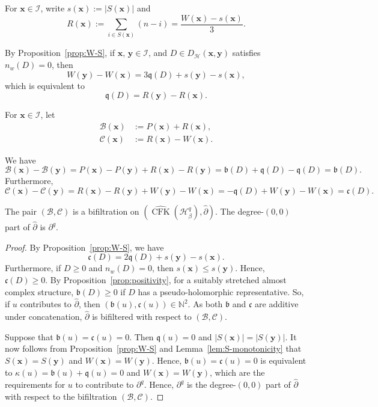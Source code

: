 \documentclass[11pt]{amsart}
\numberwithin{equation}{section}
\numberwithin{figure}{section}
\theoremstyle{definition}
\newcommand{\cB}{\mathcal{B}}
\newcommand{\cC}{\mathcal{C}}
\newcommand{\cH}{\mathcal{H}}
\newcommand{\cI}{\mathcal{I}}
\newcommand{\bN}{\mathbb{N}}
\newcommand{\ph}{\widehat{\partial}}
\newcommand{\fb}{\mathfrak{b}}
\newcommand{\fc}{\mathfrak{c}}
\newcommand{\fq}{\mathfrak{q}}
\DeclareMathOperator{\CFK}{CFK}
\newcommand{\CFKh}{\widehat{\CFK}}
\newcommand{\xs}{\boldsymbol{x}}
\newcommand{\ys}{\boldsymbol{y}}
\begin{document}
\begin{defn}
    For $\xs \in \cI$, write $s(\xs) := |S(\xs)|$ and
    \[
    R(\xs) := \sum_{i \in S(\xs)} (n-i) = \frac{W(\xs) - s(\xs)}{3}.
    \]
\end{defn}

By Proposition~\ref{prop:W-S}, if $\xs$, $\ys \in \cI$, and $D \in D_{\cH}(\xs,\ys)$ satisfies $n_w(D) = 0$, then
\[
W(\ys) - W(\xs) = 3\fq(D) + s(\ys) - s(\xs),
\]
which is equivalent to
\[
\fq(D) = R(\ys) - R(\xs).
\]

\begin{defn}
    For $\xs \in \cI$, let
    \[
    \begin{split}
        \cB(\xs) &:= P(\xs) + R(\xs), \\
        \cC(\xs) &:= R(\xs) - W(\xs).
    \end{split}
    \]
\end{defn}

We have
\[
\cB(\xs) - \cB(\ys) = P(\xs) - P(\ys) + R(\xs) - R(\ys) = \fb(D) + \fq(D) - \fq(D) = \fb(D).
\]
Furthermore,
\[
\cC(\xs) - \cC(\ys) = R(\xs) - R(\ys) + W(\ys) - W(\xs) = -\fq(D) + W(\ys) - W(\xs) = \fc(D).
\]

\begin{prop}\label{prop:bifiltration-BC}
    The pair $(\cB, \cC)$ is a bifiltration on $(\CFKh(\cH^q_\beta), \ph)$. The degree-$(0,0)$ part of $\ph$ is $\partial^q$.
\end{prop}

\begin{proof}
By Proposition~\ref{prop:W-S}, we have
\begin{equation}\label{eqn:fc}
    \fc(D) = 2\fq(D) + s(\ys) - s(\xs).
\end{equation}
Furthermore, if $D \ge 0$ and $n_w(D) = 0$, then $s(\xs) \le s(\ys)$. Hence, $\fc(D) \ge 0$. By Proposition~\ref{prop:positivity}, for a suitably stretched almost complex structure, $\fb(D) \ge 0$ if $D$ has a pseudo-holomorphic representative. So, if $u$ contributes to $\ph$, then $(\fb(u), \fc(u)) \in \bN^2$. As both $\fb$ and $\fc$ are additive under concatenation, $\ph$ is bifiltered with respect to $(\cB,\cC)$. 

Suppose that $\fb(u) = \fc(u) = 0$. Then $\fq(u) = 0$ and $|S(\xs)| = |S(\ys)|$. It now follows from Proposition~\ref{prop:W-S} and Lemma~\ref{lem:S-monotonicity} that $S(\xs) = S(\ys)$ and $W(\xs) = W(\ys)$. Hence, $\fb(u) = \fc(u) = 0$ is equivalent to $\kappa(u) = \fb(u) + \fq(u) = 0$ and $W(\xs) = W(\ys)$, which are the requirements for $u$ to contribute to $\partial^q$. Hence, $\partial^q$ is the degree-$(0,0)$ part of $\ph$ with respect to the bifiltration $(\cB,\cC)$.
\end{proof}
\end{document}
